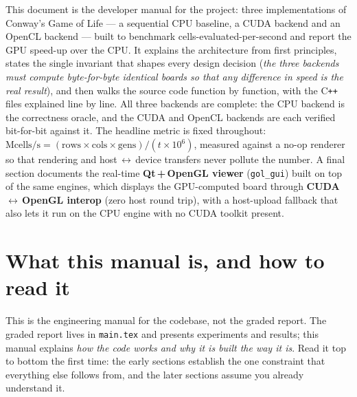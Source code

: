 \documentclass[
	english,
	letterpaper, oneside
]{article}
\begin{document}
\templatePortrait

\templatePagecfg

\begin{abstractd}
	This document is the developer manual for the project: three
	implementations of Conway's Game of Life --- a sequential CPU baseline,
	a CUDA backend and an OpenCL backend --- built to benchmark
	cells-evaluated-per-second and report the GPU speed-up over the CPU. It
	explains the architecture from first principles, states the single
	invariant that shapes every design decision (\emph{the three backends
	must compute byte-for-byte identical boards so that any difference in
	speed is the real result}), and then walks the source code function by
	function, with the C\texttt{++} files explained line by line. All three
	backends are complete: the CPU backend is the correctness oracle, and the
	CUDA and OpenCL backends are each verified bit-for-bit against it. The
	headline metric is fixed throughout:
	$\text{Mcells/s} = (\text{rows}\times\text{cols}\times\text{gens}) /
	(t \times 10^{6})$, measured against a no-op renderer so that rendering
	and host\,$\leftrightarrow$\,device transfers never pollute the number.
	A final section documents the real-time \textbf{Qt\,+\,OpenGL viewer}
	(\texttt{gol\_gui}) built on top of the same engines, which displays the
	GPU-computed board through \textbf{CUDA\,$\leftrightarrow$\,OpenGL interop}
	(zero host round trip), with a host-upload fallback that also lets it run on
	the CPU engine with no CUDA toolkit present.
\end{abstractd}

\templateIndex

\templateFinalcfg


\section{What this manual is, and how to read it}
\label{sec:intro}

This is the engineering manual for the codebase, not the graded report. The
graded report lives in \texttt{main.tex} and presents experiments and results;
this manual explains \emph{how the code works and why it is built the way it
is}. Read it top to bottom the first time: the early sections establish the one
constraint that everything else follows from, and the later sections assume you
already understand it.
\end{document}
